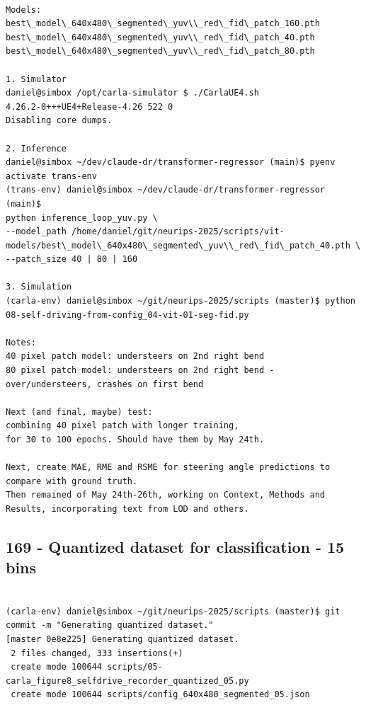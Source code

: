 \begin{verbatim}

Models:
best\_model\_640x480\_segmented\_yuv\\_red\_fid\_patch_160.pth
best\_model\_640x480\_segmented\_yuv\\_red\_fid\_patch_40.pth
best\_model\_640x480\_segmented\_yuv\\_red\_fid\_patch_80.pth

1. Simulator
daniel@simbox /opt/carla-simulator $ ./CarlaUE4.sh 
4.26.2-0+++UE4+Release-4.26 522 0
Disabling core dumps.

2. Inference
daniel@simbox ~/dev/claude-dr/transformer-regressor (main)$ pyenv activate trans-env 
(trans-env) daniel@simbox ~/dev/claude-dr/transformer-regressor (main)$ 
python inference_loop_yuv.py \
--model_path /home/daniel/git/neurips-2025/scripts/vit-models/best\_model\_640x480\_segmented\_yuv\\_red\_fid\_patch_40.pth \
--patch_size 40 | 80 | 160

3. Simulation
(carla-env) daniel@simbox ~/git/neurips-2025/scripts (master)$ python 08-self-driving-from-config_04-vit-01-seg-fid.py

Notes:
40 pixel patch model: understeers on 2nd right bend
80 pixel patch model: understeers on 2nd right bend - over/understeers, crashes on first bend

Next (and final, maybe) test:
combining 40 pixel patch with longer training,
for 30 to 100 epochs. Should have them by May 24th.

Next, create MAE, RME and RSME for steering angle predictions to compare with ground truth.
Then remained of May 24th-26th, working on Context, Methods and Results, incorporating text from LOD and others.

\end{verbatim}

\subsection{169 - Quantized dataset for classification - 15 bins}
\label{app_res:169}

\begin{verbatim}

(carla-env) daniel@simbox ~/git/neurips-2025/scripts (master)$ git commit -m "Generating quantized dataset."
[master 0e8e225] Generating quantized dataset.
 2 files changed, 333 insertions(+)
 create mode 100644 scripts/05-carla_figure8_selfdrive_recorder_quantized_05.py
 create mode 100644 scripts/config_640x480_segmented_05.json
    
\end{verbatim}

